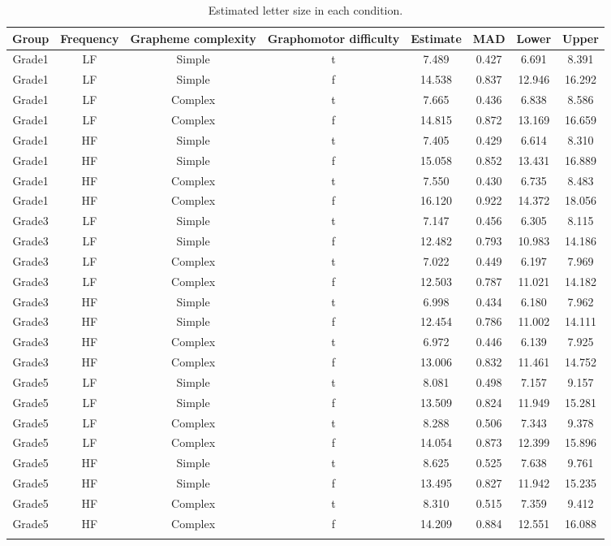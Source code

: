 \documentclass[
  11pt,
  english,
  ,doc,mask,floatsintext]{apa6}
\begin{document}
\begin{table}[htb]

\begin{center}
\begin{threeparttable}

\caption{\label{tab:size-predictions-summary}Estimated letter size in each condition.}

\scriptsize{

\begin{tabular}{cccccccc}
\toprule
Group & \multicolumn{1}{c}{Frequency} & \multicolumn{1}{c}{Grapheme complexity} & \multicolumn{1}{c}{Graphomotor difficulty} & \multicolumn{1}{c}{Estimate} & \multicolumn{1}{c}{MAD} & \multicolumn{1}{c}{Lower} & \multicolumn{1}{c}{Upper}\\
\midrule
Grade1 & LF & Simple & t & 7.489 & 0.427 & 6.691 & 8.391\\
Grade1 & LF & Simple & f & 14.538 & 0.837 & 12.946 & 16.292\\
Grade1 & LF & Complex & t & 7.665 & 0.436 & 6.838 & 8.586\\
Grade1 & LF & Complex & f & 14.815 & 0.872 & 13.169 & 16.659\\
Grade1 & HF & Simple & t & 7.405 & 0.429 & 6.614 & 8.310\\
Grade1 & HF & Simple & f & 15.058 & 0.852 & 13.431 & 16.889\\
Grade1 & HF & Complex & t & 7.550 & 0.430 & 6.735 & 8.483\\
Grade1 & HF & Complex & f & 16.120 & 0.922 & 14.372 & 18.056\\
Grade3 & LF & Simple & t & 7.147 & 0.456 & 6.305 & 8.115\\
Grade3 & LF & Simple & f & 12.482 & 0.793 & 10.983 & 14.186\\
Grade3 & LF & Complex & t & 7.022 & 0.449 & 6.197 & 7.969\\
Grade3 & LF & Complex & f & 12.503 & 0.787 & 11.021 & 14.182\\
Grade3 & HF & Simple & t & 6.998 & 0.434 & 6.180 & 7.962\\
Grade3 & HF & Simple & f & 12.454 & 0.786 & 11.002 & 14.111\\
Grade3 & HF & Complex & t & 6.972 & 0.446 & 6.139 & 7.925\\
Grade3 & HF & Complex & f & 13.006 & 0.832 & 11.461 & 14.752\\
Grade5 & LF & Simple & t & 8.081 & 0.498 & 7.157 & 9.157\\
Grade5 & LF & Simple & f & 13.509 & 0.824 & 11.949 & 15.281\\
Grade5 & LF & Complex & t & 8.288 & 0.506 & 7.343 & 9.378\\
Grade5 & LF & Complex & f & 14.054 & 0.873 & 12.399 & 15.896\\
Grade5 & HF & Simple & t & 8.625 & 0.525 & 7.638 & 9.761\\
Grade5 & HF & Simple & f & 13.495 & 0.827 & 11.942 & 15.235\\
Grade5 & HF & Complex & t & 8.310 & 0.515 & 7.359 & 9.412\\
Grade5 & HF & Complex & f & 14.209 & 0.884 & 12.551 & 16.088\\
\bottomrule
\addlinespace
\end{tabular}

}
\end{threeparttable}
\end{center}
\end{table}
\end{document}

